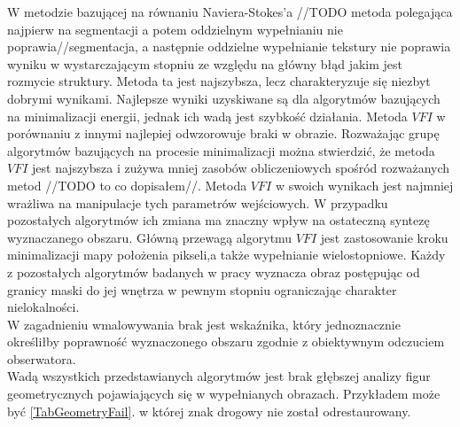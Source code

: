\documentclass[12pt, twoside, openany]{report}
\theoremstyle{definition}
\begin{document}
W metodzie bazującej na równaniu Naviera-Stokes'a //TODO metoda polegająca najpierw na segmentacji a potem oddzielnym wypełnianiu nie poprawia//segmentacja, a następnie oddzielne wypełnianie tekstury nie poprawia wyniku w wystarczającym stopniu ze względu na główny błąd jakim jest rozmycie struktury. Metoda ta jest najszybsza, lecz charakteryzuje się niezbyt dobrymi wynikami. Najlepsze wyniki uzyskiwane są dla algorytmów bazujących na minimalizacji energii, jednak ich wadą jest szybkość działania. Metoda $VFI$ w porównaniu z innymi najlepiej odwzorowuje braki w obrazie. Rozważając grupę algorytmów bazujących na procesie minimalizacji można stwierdzić, że metoda $VFI$ jest najszybsza i zużywa mniej zasobów obliczeniowych spośród rozważanych metod //TODO to co dopisałem//. Metoda $VFI$ w swoich wynikach jest najmniej wrażliwa na manipulacje tych parametrów wejściowych. W przypadku pozostałych algorytmów ich zmiana ma znaczny wpływ na ostateczną syntezę wyznaczanego obszaru. Główną przewagą algorytmu $VFI$ jest zastosowanie kroku  minimalizacji mapy położenia pikseli,a także wypełnianie wielostopniowe. Każdy z pozostałych algorytmów badanych w pracy wyznacza obraz postępując od granicy maski do jej wnętrza w pewnym stopniu ograniczając charakter nielokalności.\\
W zagadnieniu wmalowywania brak jest wskaźnika, który jednoznacznie określiłby poprawność wyznaczonego obszaru zgodnie z obiektywnym odczuciem obserwatora.
\\
Wadą wszystkich przedstawianych algorytmów jest brak głębszej analizy figur geometrycznych pojawiających się w wypełnianych obrazach. Przykładem może być \autoref{TabGeometryFail}. w której znak drogowy nie został odrestaurowany.
\end{document}
